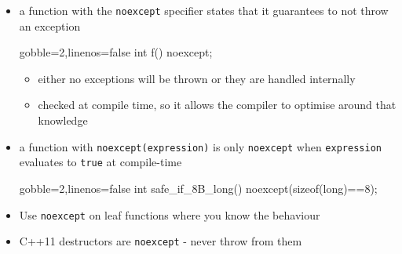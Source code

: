 \begin{frame}[fragile]
  \begin{block}{}
    \begin{itemize}
      \item a function with the \texttt{noexcept} specifier states that it guarantees to not throw an exception
      \begin{cppcode*}{gobble=2,linenos=false}
        int f() noexcept;
      \end{cppcode*}
      \begin{itemize}
        \item either no exceptions will be thrown or they are handled internally
        \item checked at compile time, so it allows the compiler to optimise around that knowledge
      \end{itemize}
      \item a function with \texttt{noexcept(expression)} is only \texttt{noexcept} when \texttt{expression} evaluates to \texttt{true} at compile-time
      \begin{cppcode*}{gobble=2,linenos=false}
        int safe_if_8B_long() noexcept(sizeof(long)==8);
      \end{cppcode*}
      \item Use \texttt{noexcept} on leaf functions where you know the behaviour
      \item C++11 destructors are \texttt{noexcept} - never throw from them
    \end{itemize}
  \end{block}
\end{frame}

